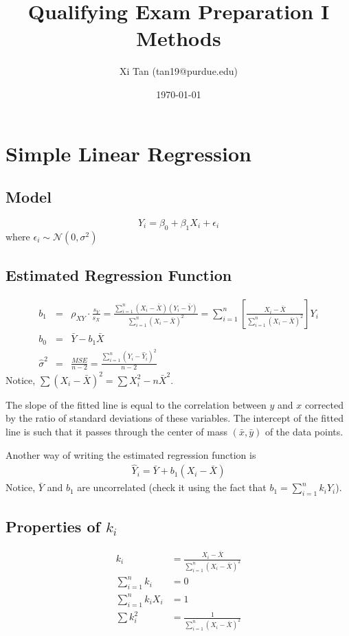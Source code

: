\documentclass{article}
\title{Qualifying Exam Preparation I \\Methods}
\author{Xi Tan (tan19@purdue.edu)}
\date{\today}
\newcommand{\NN}{\mathcal{N}}
\newcommand{\eq}[1]{\begin{align}#1\end{align}}
\newcommand{\sumn}[1]{\sum_{i=1}^n #1}
\begin{document}
\maketitle
\tableofcontents

\newpage
\section{Simple Linear Regression}

\subsection{Model}
\begin{equation}
	Y_i = \beta_0 + \beta_1 X_i + \epsilon_i
\end{equation}
where $\epsilon_i \sim \NN(0,\sigma^2)$

\subsection{Estimated Regression Function}
\begin{eqnarray}
	b_1 & = & \rho_{XY} \cdot \frac{s_Y}{s_X} = \frac{\sum_{i=1}^n (X_i-\bar X) (Y_i-\bar Y)}{\sum_{i=1}^n (X_i - \bar X)^2 } = \sum_{i=1}^n \left[\frac{X_i-\bar X}{\sum_{i=1}^n (X_i - \bar X)^2 }\right] Y_i \\
	b_0 & = & \bar Y - b_1 \bar X \\
	\hat \sigma^2 & = & \frac{MSE}{n-2} = \frac{\sum_{i=1}^n (Y_i - \hat Y_i)^2}{n-2}
\end{eqnarray}
Notice, $\sum(X_i-\bar X)^2 = \sum X_i^2 - n\bar X^2$.

The slope of the fitted line is equal to the correlation between $y$ and $x$ corrected by the ratio of standard deviations of these variables. The intercept of the fitted line is such that it passes through the center of mass $(\bar x, \bar y)$ of the data points.

Another way of writing the estimated regression function is
\eq{
	\hat Y_i = \bar Y + b_1 (X_i - \bar X)	
}
Notice, $\bar Y$ and $b_1$ are uncorrelated (check it using the fact that $b_1 = \sumn k_i Y_i$).

\subsection{Properties of $k_i$}
\eq{
	k_i &= \frac{X_i - \bar X}{\sum_{i=1}^n (X_i-\bar X)^2}\\
	\sumn k_i &= 0\\
	\sumn k_i X_i &= 1\\
	\sum k_i^2 &= \frac{1}{\sumn(X_i - \bar X)^2}
}
\end{document}
